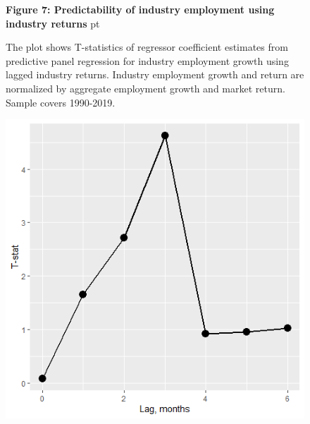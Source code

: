 \documentclass[12pt]{article}
\begin{document}
\begin{figure}
\textbf{Figure 7: Predictability of industry employment using industry returns}
 pt
\begin{flushleft}
{The plot shows T-statistics of regressor coefficient estimates from predictive panel regression for industry employment growth using lagged industry returns. Industry employment growth and return are normalized by aggregate employment growth and market return. Sample covers 1990-2019.}
\end{flushleft}
\centering
\includegraphics[width=1\textwidth]{paper_nov20/f_ret_empl_pred_t.png}
\end{figure}

\clearpage
\end{document}
